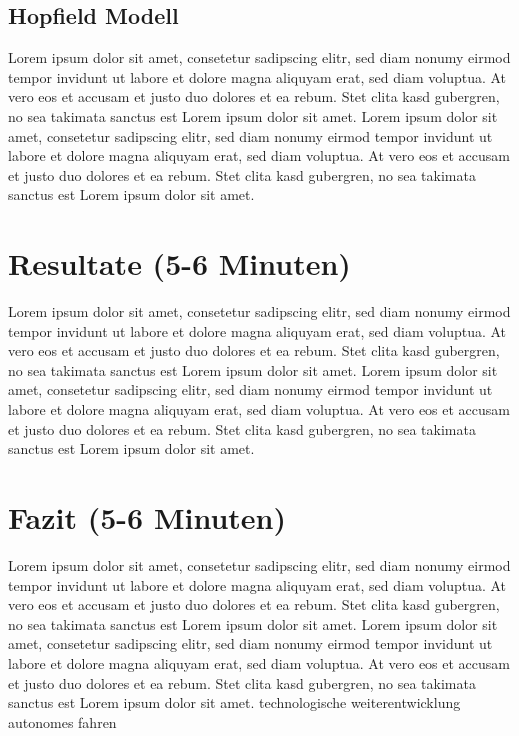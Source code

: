 \documentclass[journal=jacsat,manuscript=article]{achemso}
\begin{document}
\subsection*{Hopfield Modell}
Lorem ipsum dolor sit amet, consetetur sadipscing elitr, sed diam nonumy eirmod tempor invidunt ut labore et dolore magna aliquyam erat, sed diam voluptua. At vero eos et accusam et justo duo dolores et ea rebum. Stet clita kasd gubergren, no sea takimata sanctus est Lorem ipsum dolor sit amet. Lorem ipsum dolor sit amet, consetetur sadipscing elitr, sed diam nonumy eirmod tempor invidunt ut labore et dolore magna aliquyam erat, sed diam voluptua. At vero eos et accusam et justo duo dolores et ea rebum. Stet clita kasd gubergren, no sea takimata sanctus est Lorem ipsum dolor sit amet.


\newpage


\section*{Resultate (5-6 Minuten)}
Lorem ipsum dolor sit amet, consetetur sadipscing elitr, sed diam nonumy eirmod tempor invidunt ut labore et dolore magna aliquyam erat, sed diam voluptua. At vero eos et accusam et justo duo dolores et ea rebum. Stet clita kasd gubergren, no sea takimata sanctus est Lorem ipsum dolor sit amet. Lorem ipsum dolor sit amet, consetetur sadipscing elitr, sed diam nonumy eirmod tempor invidunt ut labore et dolore magna aliquyam erat, sed diam voluptua. At vero eos et accusam et justo duo dolores et ea rebum. Stet clita kasd gubergren, no sea takimata sanctus est Lorem ipsum dolor sit amet.

\section*{Fazit (5-6 Minuten)}
Lorem ipsum dolor sit amet, consetetur sadipscing elitr, sed diam nonumy eirmod tempor invidunt ut labore et dolore magna aliquyam erat, sed diam voluptua. At vero eos et accusam et justo duo dolores et ea rebum. Stet clita kasd gubergren, no sea takimata sanctus est Lorem ipsum dolor sit amet. Lorem ipsum dolor sit amet, consetetur sadipscing elitr, sed diam nonumy eirmod tempor invidunt ut labore et dolore magna aliquyam erat, sed diam voluptua. At vero eos et accusam et justo duo dolores et ea rebum. Stet clita kasd gubergren, no sea takimata sanctus est Lorem ipsum dolor sit amet.
technologische weiterentwicklung autonomes fahren


\newpage

\listoffigures

\newpage

\listoftables


\end{document}
